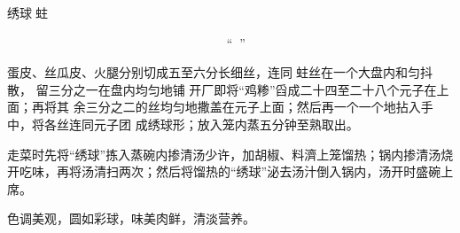 \begin{recipe}{绣球𧎼蛀}

\ingredients


\preparation

\step 𧎼蛀抠去玉带，淘洗干净，掺清水上笼蒸粑，取出挤干水晾冷，搓散成丝；鸡脯、
肥膘分别砸茸；鸡蛋清调匀，加清水、豆粉、味精、盐搅成“鸡糁”；用鸡蛋一个摊成蛋皮
。

\step 蛋皮、丝瓜皮、火腿分别切成五至六分长细丝，连同𧎼蛀丝在一个大盘内和匀抖散，
留三分之一在盘内均匀地铺 开厂即将“鸡糁”舀成二十四至二十八个元子在上面；再将其
余三分之二的丝均匀地撒盖在元子上面；然后再一个一个地拈入手中，将各丝连同元子团
成绣球形；放入笼内蒸五分钟至熟取出。

\step 走菜时先将“绣球”拣入蒸碗内掺清汤少许，加胡椒、料濟上笼馏热；锅内掺清汤烧
开吃味，再将汤清扫两次；然后将馏热的“绣球”泌去汤汁倒入锅内，汤开时盛碗上席。

\features

色调美观，圆如彩球，味美肉鲜，清淡营养。

\end{recipe}

